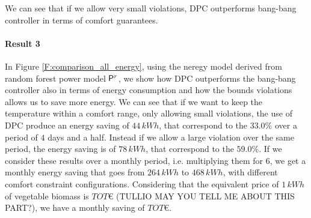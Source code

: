 We can see that if we allow very small violations, DPC outperforms bang-bang controller in terms of comfort guarantees.

\paragraph{Result 3} In Figure \ref{F:comparison_all_energy}, using the neregy model derived from random forest power model $\mathsf{P}^r$, we show how DPC outperforms the bang-bang controller also in terms of energy consumption and how the bounds violations allows us to save more energy. We can see that if we want to keep the temperature within a comfort range, only allowing small violations, the use of DPC produce an energy saving of $44\, kWh$, that correspond to the $33.0\%$ over a period of $4$ days and a half. Instead if we allow a large violation over the same period, the energy saving is of $78\, kWh$, that correspond to the $59.0\%$. If we consider these results over a monthly period, i.e. multiplying them for $6$, we get a monthly energy saving that goes from $264\,kWh$ to $468\,kWh$, with different comfort constraint configurations. Considering that the equivalent price of $1\,kWh$ of vegetable biomass is $TOT$\euro{} (TULLIO MAY YOU TELL ME ABOUT THIS PART?), we have a monthly saving of $TOT$\euro{}.

